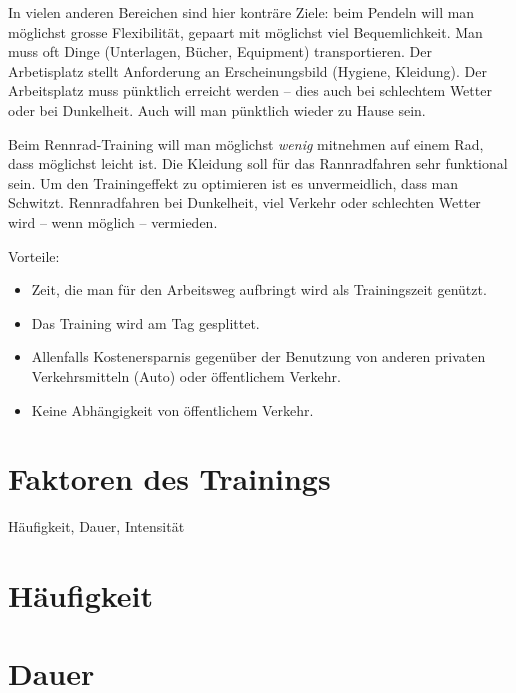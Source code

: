 \documentclass[a4paper,DIV13,BCOR1cm]{scrbook}
\begin{document}
In vielen anderen Bereichen sind hier konträre Ziele: beim Pendeln will man
möglichst grosse Flexibilität, gepaart mit möglichst viel Bequemlichkeit.
Man muss oft Dinge (Unterlagen, Bücher, Equipment) transportieren. Der
Arbetisplatz stellt Anforderung an Erscheinungsbild (Hygiene, Kleidung). Der
Arbeitsplatz muss pünktlich erreicht werden -- dies auch bei schlechtem
Wetter oder bei Dunkelheit. Auch will man pünktlich wieder zu Hause sein.

Beim Rennrad-Training will man möglichst \emph{wenig} mitnehmen auf einem
Rad, dass möglichst leicht ist. Die Kleidung soll für das Rannradfahren sehr
funktional sein. Um den Trainingeffekt zu optimieren ist es unvermeidlich,
dass man Schwitzt. Rennradfahren bei Dunkelheit, viel Verkehr oder schlechten
Wetter wird -- wenn möglich -- vermieden.

Vorteile:
\begin{itemize}
        \item Zeit, die man für den Arbeitsweg aufbringt wird als Trainingszeit genützt.
        \item Das Training wird am Tag gesplittet.
        \item Allenfalls Kostenersparnis gegenüber der Benutzung von anderen privaten Verkehrsmitteln (Auto) oder öffentlichem Verkehr.
        \item Keine Abhängigkeit von öffentlichem Verkehr.
\end{itemize}
\section{Faktoren des Trainings}

Häufigkeit, Dauer, Intensität

\section{Häufigkeit}

\section{Dauer}
\end{document}
